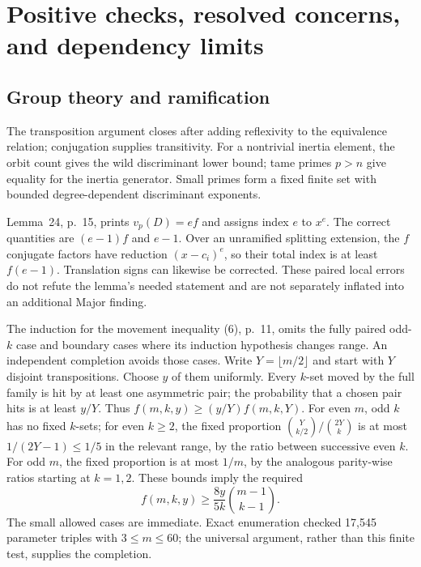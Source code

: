 \documentclass[10pt]{article}
\begin{document}
\section*{Positive checks, resolved concerns, and dependency limits}
\subsection*{Group theory and ramification}
The transposition argument closes after adding reflexivity to the equivalence relation; conjugation supplies transitivity. For a nontrivial inertia element, the orbit count gives the wild discriminant lower bound; tame primes \(p>n\) give equality for the inertia generator. Small primes form a fixed finite set with bounded degree-dependent discriminant exponents.\par
Lemma 24, p. 15, prints \(v_p(D)=ef\) and assigns index \(e\) to \(x^e\). The correct quantities are \((e-1)f\) and \(e-1\). Over an unramified splitting extension, the \(f\) conjugate factors have reduction \((x-c_i)^e\), so their total index is at least \(f(e-1)\). Translation signs can likewise be corrected. These paired local errors do not refute the lemma’s needed statement and are not separately inflated into an additional Major finding.\par
The induction for the movement inequality (6), p. 11, omits the fully paired odd-\(k\) case and boundary cases where its induction hypothesis changes range. An independent completion avoids those cases. Write \(Y=\lfloor m/2\rfloor\) and start with \(Y\) disjoint transpositions. Choose \(y\) of them uniformly. Every \(k\)-set moved by the full family is hit by at least one asymmetric pair; the probability that a chosen pair hits is at least \(y/Y\). Thus \(f(m,k,y)\ge(y/Y)f(m,k,Y)\). For even \(m\), odd \(k\) has no fixed \(k\)-sets; for even \(k\ge2\), the fixed proportion \(\binom{Y}{k/2}/\binom{2Y}{k}\) is at most \(1/(2Y-1)\le1/5\) in the relevant range, by the ratio between successive even \(k\). For odd \(m\), the fixed proportion is at most \(1/m\), by the analogous parity-wise ratios starting at \(k=1,2\). These bounds imply the required \[f(m,k,y)\ge \frac{8y}{5k}\binom{m-1}{k-1}.\] The small allowed cases are immediate. Exact enumeration checked 17,545 parameter triples with \(3\le m\le60\); the universal argument, rather than this finite test, supplies the completion.\par
\end{document}
